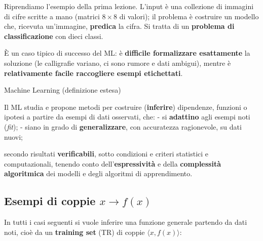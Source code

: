 Riprendiamo l'esempio della prima lezione. L'input è una collezione di
immagini di cifre scritte a mano (matrici \(8\times 8\) di valori); il
problema è costruire un modello che, ricevuta un'immagine,
\textbf{predica} la cifra. Si tratta di un \textbf{problema di
classificazione} con dieci classi.

È un caso tipico di successo del ML: è \textbf{difficile formalizzare
esattamente} la soluzione (le calligrafie variano, ci sono rumore e dati
ambigui), mentre è \textbf{relativamente facile raccogliere esempi
etichettati}.

\begin{boxdefinition}{Machine Learning (definizione estesa)}

Il ML studia e propone metodi per costruire (\textbf{inferire})
dipendenze, funzioni o ipotesi a partire da esempi di dati osservati,
che: - si \textbf{adattino} agli esempi noti (\emph{fit}); - siano in
grado di \textbf{generalizzare}, con accuratezza ragionevole, su dati
nuovi;

secondo risultati \textbf{verificabili}, sotto condizioni e criteri
statistici e computazionali, tenendo conto dell'\textbf{espressività} e
della \textbf{complessità algoritmica} dei modelli e degli algoritmi di
apprendimento.

\end{boxdefinition}

\subsection{\texorpdfstring{Esempi di coppie
\(x \to f(x)\)}{Esempi di coppie x \textbackslash to f(x)}}\label{esempi-di-coppie-x-to-fx}

In tutti i casi seguenti si vuole inferire una funzione generale
partendo da dati noti, cioè da un \textbf{training set} (TR) di coppie
\(\langle x, f(x)\rangle\):

